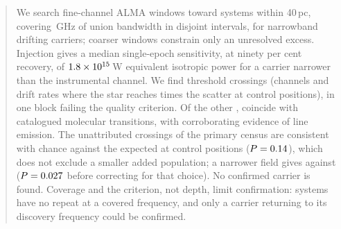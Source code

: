 \begin{abstract}
We search \NWinA{} fine-channel ALMA windows toward \NSysClassA{} systems
within 40\,pc, covering \CvUnionA\,GHz of union bandwidth in
\CovNIslands{} disjoint intervals, for narrowband drifting carriers;
\NWinB{} coarser windows constrain only an unresolved excess. Injection
gives a median single-epoch sensitivity, at ninety per cent recovery, of
$\EirpNinetySysMedA$\,W equivalent isotropic power for a carrier narrower
than the instrumental channel. We find \EvNCrossRaw{} threshold crossings
(channels and drift rates where the star reaches \StageNullTrig{} times the
scatter at control positions), \EvNCrossFlag{} in one block failing the
quality criterion. Of the other \EvNCrossQp{}, \MkNCoinc{} coincide with
catalogued molecular transitions, \LnAttrSupp{} with corroborating evidence
of line emission. The \CeObs{} unattributed crossings of the primary census
are consistent with chance against the \CeExp{} expected at control
positions ($P=\CeProbNull$), which does not exclude a smaller added
population; a narrower field gives \FrNarrowObs{} against \FrNarrowExp{}
($P=\FrNarrowProb$ before correcting for that choice). No confirmed carrier
is found. Coverage and the criterion, not depth, limit confirmation:
\ZcNoRepSys{} systems have no repeat at a covered frequency, and only a
carrier returning to its discovery frequency could be confirmed.
\end{abstract}


